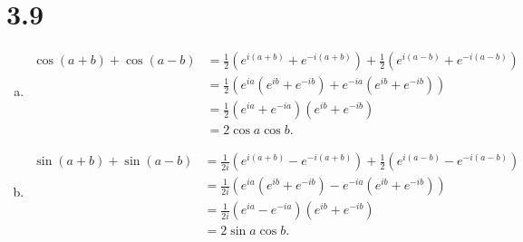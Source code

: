 \documentclass[10pt]{mypackage}
\begin{document}
\section{3.9}%
\begin{enumerate}[(a)]
  \item
    \begin{align*}
      \cos\left(a+b\right) + \cos\left(a-b\right) &= \frac{1}{2}\left(e^{i\left(a+b\right)} + e^{-i\left(a+b\right)}\right) + \frac{1}{2}\left(e^{i\left(a-b\right)} + e^{-i\left(a-b\right)}\right)\\
                                                  &= \frac{1}{2}\left(e^{ia}\left(e^{ib} +e^{-ib}\right) + e^{-ia}\left(e^{ib} + e^{-ib}\right)\right)\\
                                                  &= \frac{1}{2}\left(e^{ia} + e^{-ia}\right)\left(e^{ib} + e^{-ib}\right)\\
                                                  &= 2\cos a \cos b.
    \end{align*}
  \item 
    \begin{align*}
      \sin\left(a+b\right) + \sin\left(a-b\right) &= \frac{1}{2i}\left(e^{i\left(a + b\right)} - e^{-i\left(a+b\right)}\right) + \frac{1}{2}\left(e^{i\left(a-b\right)} - e^{-i\left(a-b\right)}\right)\\
                                                  &= \frac{1}{2i}\left(e^{ia}\left(e^{ib} + e^{-ib}\right) - e^{-ia}\left(e^{ib} + e^{-ib}\right)\right)\\
                                                  &= \frac{1}{2i}\left(e^{ia} - e^{-ia}\right)\left(e^{ib} + e^{-ib}\right)\\
                                                  &= 2\sin a \cos b.
    \end{align*}
\end{enumerate}
\end{document}
